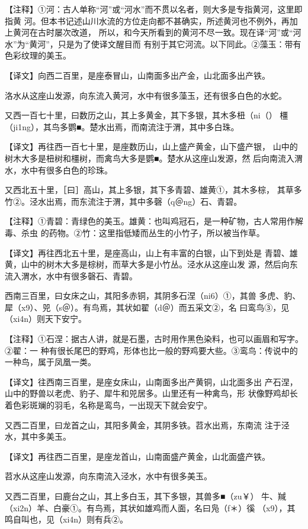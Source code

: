 \documentclass[a4paper,12pt,UTF8,twoside]{ctexbook}
\begin{document}
【注释】①河：古人单称“河”或“河水”而不贯以名者，则大多是专指黄河，这里即指黄 河。但本书记述山川水流的方位走向都不甚确实，所述黄河也不例外，再加上黄河在古时屡次改道， 所以，和今天所看到的黄河不尽一致。现在译“河”或“河水”为“黄河”，只是为了使译文醒目而 有别于其它河流。以下同此。②藻玉：带有色彩纹理的美玉。

【译文】向西二百里，是座泰冒山，山南面多出产金，山北面多出产铁。

洛水从这座山发源，向东流入黄河，水中有很多藻玉，还有很多白色的水蛇。

又西一百七十里，曰数历之山，其上多黄金，其下多银，其木多杻（ni（） 橿（ji1ng），其鸟多鹦■。楚水出焉，而南流注于渭，其中多白珠。

【译文】再往西一百七十里，是座数历山，山上盛产黄金，山下盛产银， 山中的树木大多是杻树和橿树，而禽鸟大多是鹦■。楚水从这座山发源，然 后向南流入渭水，水中有很多白色的珍珠。

又西北五十里，［曰］高山，其上多银，其下多青碧、雄黄①，其木多棕， 其草多竹②。泾水出焉，而东流注于渭，其中多磬（q＠ng）石、青碧。

【注释】①青碧：青绿色的美玉。雄黄：也叫鸡冠石，是一种矿物，古人常用作解毒、杀虫 的药物。②竹：这里指低矮而丛生的小竹子，所以被当作草。

【译文】再往西北五十里，是座高山，山上有丰富的白银，山下到处是 青碧、雄黄，山中的树木大多是棕树，而草大多是小竹丛。泾水从这座山发 源，然后向东流入渭水，水中有很多磬石、青碧。

西南三百里，曰女床之山，其阳多赤铜，其阴多石涅（ni6）①，其兽 多虎、豹、犀（x9）、兕（s＠）。有鸟焉，其状如翟（d＠）而五采文②，名 曰鸾鸟③，见（xi4n）则天下安宁。

【注释】①石涅：据古人讲，就是石墨，古时用作黑色染料，也可以画眉和写字。②翟：一 种有很长尾巴的野鸡，形体也比一般的野鸡要大些。③鸾鸟：传说中的一种鸟，属于凤凰一类。

【译文】往西南三百里，是座女床山，山南面多出产黄铜，山北面多出 产石涅，山中的野兽以老虎、豹子、犀牛和兕居多。山里还有一种禽鸟，形 状像野鸡却长着色彩斑斓的羽毛，名称是鸾鸟，一出现天下就会安宁。

又西二百里，曰龙首之山，其阳多黄金，其阴多铁。苕水出焉，东南流 注于泾水，其中多美玉。

【译文】再往西二百里，是座龙首山，山南面盛产黄金，山北面盛产铁。

苕水从这座山发源，向东南流入泾水，水中有很多美玉。

又西二百里，曰鹿台之山，其上多白玉，其下多银，其兽多■（zu￥） 牛、羬（xi2n）羊、白豪①。有鸟焉，其状如雄鸡而人面，名曰凫（f＊）徯 （x9），其鸣自叫也，见（xi4n）则有兵②。
\end{document}
